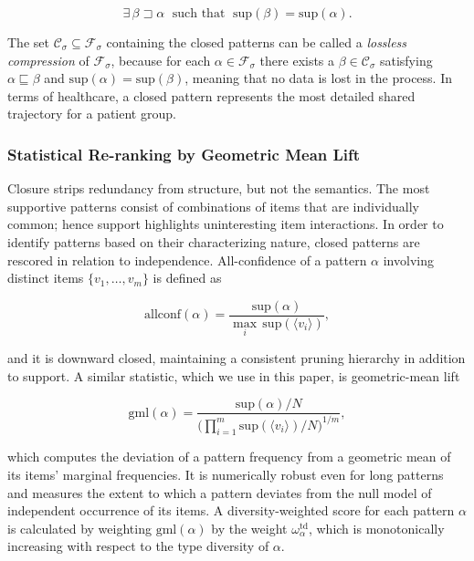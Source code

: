 \begin{equation}
    \exists\, \beta \sqsupset \alpha \;\text{ such that }\; \mathrm{sup}(\beta) = \mathrm{sup}(\alpha).
    \label{eq:closed}
\end{equation}

The set $\mathcal{C}_\sigma \subseteq \mathcal{F}_\sigma$ containing the closed patterns can be called a \emph{lossless compression} of $\mathcal{F}_\sigma$, because for each $\alpha \in \mathcal{F}_\sigma$ there exists a $\beta \in \mathcal{C}_\sigma$ satisfying $\alpha \sqsubseteq \beta$ and $\mathrm{sup}(\alpha) = \mathrm{sup}(\beta)$, meaning that no data is lost in the process. In terms of healthcare, a closed pattern represents the most detailed shared trajectory for a patient group.

\subsubsection*{Statistical Re-ranking by Geometric Mean Lift}

Closure strips redundancy from structure, but not the semantics. The most supportive patterns consist of combinations of items that are individually common; hence support highlights uninteresting item interactions. In order to identify patterns based on their characterizing nature, closed patterns are rescored in relation to independence. All-confidence of a pattern $\alpha$ involving distinct items $\{v_1, \ldots, v_m\}$ \cite{omiecinski2003} is defined as

\begin{equation}
    \mathrm{allconf}(\alpha) = \frac{\mathrm{sup}(\alpha)}{\max_{i}\, \mathrm{sup}(\langle v_i \rangle)},
    \label{eq:allconf}
\end{equation}

and it is downward closed, maintaining a consistent pruning hierarchy in addition to support. A similar statistic, which we use in this paper, is geometric-mean lift

\begin{equation}
    \mathrm{gml}(\alpha) = \frac{\mathrm{sup}(\alpha)/N}{\bigl(\prod_{i=1}^{m} \mathrm{sup}(\langle v_i \rangle)/N\bigr)^{1/m}},
    \label{eq:gml}
\end{equation}

which computes the deviation of a pattern frequency from a geometric mean of its items' marginal frequencies. It is numerically robust even for long patterns and measures the extent to which a pattern deviates from the null model of independent occurrence of its items. A diversity-weighted score for each pattern $\alpha$ is calculated by weighting $\mathrm{gml}(\alpha)$ by the weight $\omega_\alpha^{\mathrm{td}}$, which is monotonically increasing with respect to the type diversity of $\alpha$.

